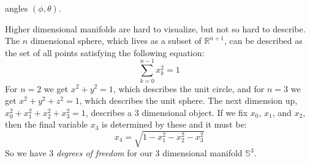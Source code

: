 \documentclass{article}
\theoremstyle{plain}
\theoremstyle{normal}
\begin{document}
        angles $(\phi,\theta)$.
        \par\hfill\par
        Higher dimensional manifolds are hard to visualize, but not so hard to
        describe. The $n$ dimensional sphere, which lives as a subset of
        $\mathbb{R}^{n+1}$, can be described as the set of all points
        satisfying the following equation:
        \begin{equation}
            \sum_{k=0}^{n-1}x_{k}^{2}=1
        \end{equation}
        For $n=2$ we get $x^{2}+y^{2}=1$, which describes the unit circle, and
        for $n=3$ we get $x^{2}+y^{2}+z^{2}=1$, which describes the unit
        sphere. The next dimension up,
        $x_{0}^{2}+x_{1}^{2}+x_{2}^{2}+x_{3}^{2}=1$, describes a 3 dimensional
        object. If we fix $x_{0}$, $x_{1}$, and $x_{2}$, then the final
        variable $x_{3}$ is determined by these and it must be:
        \begin{equation}
            x_{4}=\sqrt{1-x_{1}^{2}-x_{2}^{2}-x_{3}^{2}}
        \end{equation}
        So we have 3 \textit{degrees of freedom} for our 3 dimensional
        manifold $\mathbb{S}^{3}$.
\end{document}
